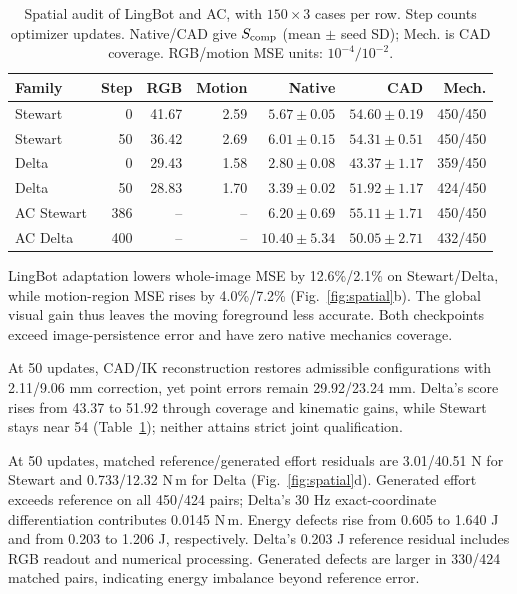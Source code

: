 \documentclass[10pt,twocolumn,letterpaper]{article}
\begin{document}
\begingroup
\setlength{\intextsep}{5pt}
\begin{table}[H]
\caption{Spatial audit of LingBot and AC, with $150\times3$ cases per row. Step counts optimizer updates. Native/CAD give $S_{\rm comp}$ (mean $\pm$ seed SD); Mech. is CAD coverage. RGB/motion MSE units: $10^{-4}/10^{-2}$.}
\label{tab:spatial}
\centering\footnotesize
\setlength{\tabcolsep}{2.0pt}
\begin{tabular}{@{}lrrrrrr@{}}
\toprule
Family & Step & RGB & Motion & Native & CAD & Mech.\\
\midrule
Stewart & 0 & 41.67 & 2.59 & $5.67\!\pm\!0.05$ & $54.60\!\pm\!0.19$ & 450/450 \\
Stewart & 50 & 36.42 & 2.69 & $6.01\!\pm\!0.15$ & $54.31\!\pm\!0.51$ & 450/450 \\
Delta & 0 & 29.43 & 1.58 & $2.80\!\pm\!0.08$ & $43.37\!\pm\!1.17$ & 359/450 \\
Delta & 50 & 28.83 & 1.70 & $3.39\!\pm\!0.02$ & $51.92\!\pm\!1.17$ & 424/450 \\
\midrule
AC Stewart & 386 & -- & -- & $6.20\!\pm\!0.69$ & $55.11\!\pm\!1.71$ & 450/450 \\
AC Delta & 400 & -- & -- & $10.40\!\pm\!5.34$ & $50.05\!\pm\!2.71$ & 432/450 \\
\bottomrule
\end{tabular}
\end{table}
\endgroup

LingBot adaptation lowers whole-image MSE by 12.6\%/2.1\% on Stewart/Delta, while motion-region MSE rises by 4.0\%/7.2\% (Fig.~\ref{fig:spatial}b). The global visual gain thus leaves the moving foreground less accurate. Both checkpoints exceed image-persistence error and have zero native mechanics coverage.

At 50 updates, CAD/IK reconstruction restores admissible configurations with 2.11/9.06 mm correction, yet point errors remain 29.92/23.24 mm. Delta's score rises from 43.37 to 51.92 through coverage and kinematic gains, while Stewart stays near 54 (Table~\ref{tab:spatial}); neither attains strict joint qualification.

At 50 updates, matched reference/generated effort residuals are 3.01/40.51 N for Stewart and 0.733/12.32 N\,m for Delta (Fig.~\ref{fig:spatial}d). Generated effort exceeds reference on all 450/424 pairs; Delta's 30 Hz exact-coordinate differentiation contributes 0.0145 N\,m. Energy defects rise from 0.605 to 1.640 J and from 0.203 to 1.206 J, respectively. Delta's 0.203 J reference residual includes RGB readout and numerical processing. Generated defects are larger in 330/424 matched pairs, indicating energy imbalance beyond reference error.
\end{document}

